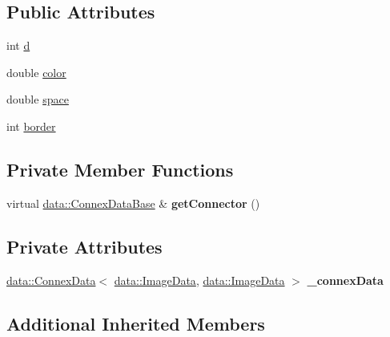 \subsection*{Public Attributes}
\begin{DoxyCompactItemize}
\item 
int \hyperlink{classfilter_1_1algos_1_1_bilateral_filter_aa5c6a1eb8e86de0868f87b58ac5ca8f5}{d}
\item 
double \hyperlink{classfilter_1_1algos_1_1_bilateral_filter_a3cb2bbf9a7f536d9e706cab30b48f177}{color}
\item 
double \hyperlink{classfilter_1_1algos_1_1_bilateral_filter_a9b408992e14ae094c68c4cd3f706def0}{space}
\item 
int \hyperlink{classfilter_1_1algos_1_1_bilateral_filter_a0254db5121a0c78fcb46d824ab2069d3}{border}
\end{DoxyCompactItemize}
\subsection*{Private Member Functions}
\begin{DoxyCompactItemize}
\item 
\mbox{\label{classfilter_1_1algos_1_1_bilateral_filter_ab0ce3ff1bab30775bb2694644912d0c3}} 
virtual \hyperlink{classfilter_1_1data_1_1_connex_data_base}{data\+::\+Connex\+Data\+Base} \& {\bfseries get\+Connector} ()
\end{DoxyCompactItemize}
\subsection*{Private Attributes}
\begin{DoxyCompactItemize}
\item 
\mbox{\label{classfilter_1_1algos_1_1_bilateral_filter_af6683b48521382d5c269f50f7f6e80ff}} 
\hyperlink{classfilter_1_1data_1_1_connex_data}{data\+::\+Connex\+Data}$<$ \hyperlink{classfilter_1_1data_1_1_image_data}{data\+::\+Image\+Data}, \hyperlink{classfilter_1_1data_1_1_image_data}{data\+::\+Image\+Data} $>$ {\bfseries \+\_\+connex\+Data}
\end{DoxyCompactItemize}
\subsection*{Additional Inherited Members}


